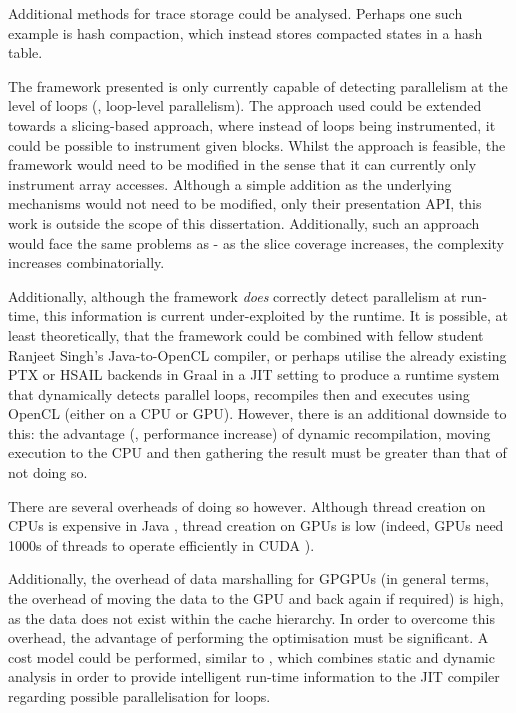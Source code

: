 Additional methods for trace storage could be analysed. Perhaps one such example is hash compaction, which instead stores compacted states in a hash table.

The framework presented is only currently capable of detecting parallelism at the level of loops (\ie, loop-level parallelism). The approach used could be extended towards a slicing-based approach, where instead of loops being instrumented, it could be possible to instrument given blocks. Whilst the approach is feasible, the framework would need to be modified in the sense that it can currently only instrument array accesses. Although a simple addition as the underlying mechanisms would not need to be modified, only their presentation API, this work is outside the scope of this dissertation. Additionally, such an approach would face the same problems as \citet{Wang2009} - as the slice coverage increases, the complexity increases combinatorially. 

Additionally, although the framework \emph{does} correctly detect parallelism at run-time, this information is current under-exploited by the runtime. It is possible, at least theoretically, that the framework could be combined with fellow student Ranjeet Singh's Java-to-OpenCL compiler, or perhaps utilise the already existing PTX or HSAIL backends in Graal in a JIT setting to produce a runtime system that dynamically detects parallel loops, recompiles then and executes using OpenCL (either on a CPU or GPU). However, there is an additional downside to this: the advantage (\ie, performance increase) of dynamic recompilation, moving execution to the CPU and then gathering the result must be greater than that of not doing so.

There are several overheads of doing so however. Although thread creation on CPUs is expensive in Java \citep{JSR133}, thread creation on GPUs is low \citep{Mueller2009} (indeed, GPUs need 1000s of threads to operate efficiently in CUDA \citep{Nvidia2011}).

Additionally, the overhead of data marshalling for GPGPUs (in general terms, the overhead of moving the data to the GPU and back again if required) is high, as the data does not exist within the cache hierarchy. In order to overcome this overhead, the advantage of performing the optimisation must be significant. A cost model could be performed, similar to \citet{Tournavitis2009}, which combines static and dynamic analysis in order to provide intelligent run-time information to the JIT compiler regarding possible parallelisation for loops.